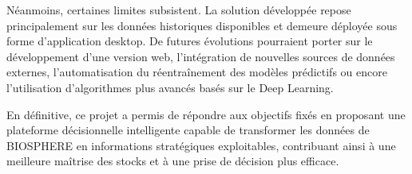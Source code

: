 Néanmoins, certaines limites subsistent. La solution développée repose principalement sur les données historiques disponibles et demeure déployée sous forme d'application desktop. De futures évolutions pourraient porter sur le développement d'une version web, l'intégration de nouvelles sources de données externes, l'automatisation du réentraînement des modèles prédictifs ou encore l'utilisation d'algorithmes plus avancés basés sur le Deep Learning.

En définitive, ce projet a permis de répondre aux objectifs fixés en proposant une plateforme décisionnelle intelligente capable de transformer les données de BIOSPHERE en informations stratégiques exploitables, contribuant ainsi à une meilleure maîtrise des stocks et à une prise de décision plus efficace.
